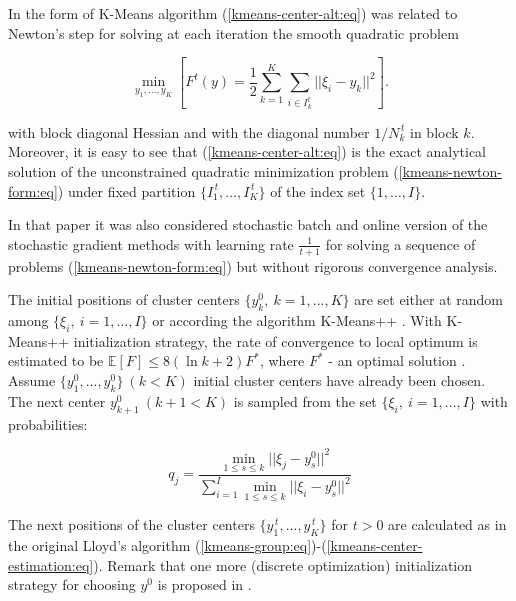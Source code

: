 In \cite{Bottou_1994} the form of K-Means algorithm (\ref{kmeans-center-alt:eq}) was related to Newton's step for solving at each iteration the smooth quadratic problem

\begin{equation}
    \label{kmeans-newton-form:eq}
        \min_{y_1,\ldots,y_K}\left[F^t(y) = \frac{1}{2} \sum_{k=1}^K \sum_{i \in I_k^t} || \xi_i - y_k ||^2\right].
\end{equation}

\noindent with block diagonal Hessian and with the diagonal number $ 1/N_k^{\,t} $ in block $ k $. Moreover, it is easy to see that (\ref{kmeans-center-alt:eq}) is the exact analytical solution of the unconstrained quadratic minimization problem (\ref{kmeans-newton-form:eq}) under fixed partition $\{I_1^{\,t},\ldots,I_K^{\,t}\}$ of the index set $\{1,\ldots,I\}$.

In that paper it was also considered stochastic batch and online version of the stochastic gradient methods with learning rate $ \frac{1}{t + 1} $ for solving a sequence of problems (\ref{kmeans-newton-form:eq}) but without rigorous convergence analysis.

The initial positions of cluster centers $ \{ y_k^0, \> k = 1, ..., K \} $ are set either at random among $ \{ \xi_i, \> i = 1, ..., I \} $ or according the algorithm K-Means++ \cite{Arthur_Vassilvitskii_2007,Nguyen_Duong_2018}. With K-Means++ initialization strategy, the rate of convergence to local optimum is estimated to be $ \mathbb{E} [F] \leq 8(\ln k + 2 ) F^{*} $, where $ F^{*} $ - an optimal solution \cite{Arthur_Vassilvitskii_2007}. Assume $ \{ y_1^0, ..., y_k^0 \} \> (k<K) $ initial cluster centers have already been chosen. The next center $ y_{k+1}^0 \> (k+1<K) $ is sampled from the set $ \{ \xi_i, \> i = 1, ..., I \} $ with probabilities:

\begin{equation}
    \label{kmeans-plus-plus-init:eq}
        q_j = \frac{\min_{1 \leq s \leq k} || \xi_j - y_s^0 ||^2}{\sum_{i=1}^I \min_{1 \leq s \leq k} || \xi_i - y_s^0 ||^2}
\end{equation}

The next positions of the cluster centers $ \{ y_1^{\,t}, ..., y_K^{\,t} \} $ for $ t > 0 $ are calculated as in the original Lloyd's algorithm (\ref{kmeans-group:eq})-(\ref{kmeans-center-estimation:eq}). Remark that one more (discrete optimization) initialization strategy for choosing $y^{0}$ is proposed in \cite[Sec. 4, Stage 1]{Kuzmenko_Uryasev_2019}.


